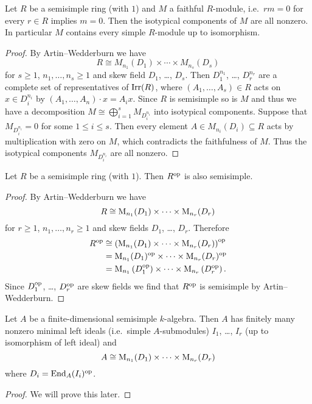 \begin{cor}
  Let $R$ be a semisimple ring (with $1$) and $M$ a faithful $R$-module, i.e.\ $rm = 0$ for every $r \in R$ implies $m = 0$.
  Then the isotypical components of $M$ are all nonzero.
  In particular $M$ contains every simple $R$-module up to isomorphism.
\end{cor}
\begin{proof}
  By Artin--Wedderburn we have
  \[
    R \cong M_{n_1}(D_1) \times \dotsb \times M_{n_s}(D_s)
  \]
  for $s \geq 1$, $n_1, \dotsc, n_s \geq 1$ and skew field $D_1$, \dots, $D_s$.
  Then $D_1^{n_1}$, \dots, $D_r^{n_r}$ are a complete set of representatives of $\operatorname{Irr}(R)$, where $(A_1, \dotsc, A_s) \in R$ acts on $x \in D_i^{n_i}$ by $(A_1, \dotsc, A_n) \cdot x = A_i x$.
  Since $R$ is semisimple so is $M$ and thus we have a decomposition $M \cong \bigoplus_{i=1}^s M_{D_i^{n_i}}$ into isotypical components.
  Suppose that $M_{D_i^{n_i}} = 0$ for some $1 \leq i \leq s$.
  Then every element $A \in M_{n_i}(D_i) \subseteq R$ acts by multiplication with zero on $M$, which contradicts the faithfulness of $M$.
  Thus the isotypical components $M_{D_i^{n_i}}$ are all nonzero.
\end{proof}




\begin{cor}
  Let $R$ be a semisimple ring (with $1$).
  Then $R^{\mathrm{op}}$ is also semisimple.
\end{cor}
\begin{proof}
  By Artin--Wedderburn we have
  \[
    R \cong \operatorname{M}_{n_1}(D_1) \times \dotsm \times \operatorname{M}_{n_r}(D_r)
  \]
  for $r \geq 1$, $n_1, \dotsc, n_r \geq 1$ and skew fields $D_1$, \dots, $D_r$.
  Therefore
  \begin{align*}
            R^{\mathrm{op}}
    &\cong  \left( \operatorname{M}_{n_1}(D_1) \times \dotsm \times \operatorname{M}_{n_r}(D_r) \right)^{\mathrm{op}} \\
    &=      \operatorname{M}_{n_1}(D_1)^{\mathrm{op}} \times \dotsm \times \operatorname{M}_{n_r}(D_r)^{\mathrm{op}} \\
    &=      \operatorname{M}_{n_1}\left( D_1^{\mathrm{op}} \right) \times \dotsm \times \operatorname{M}_{n_r}\left( D_r^{\mathrm{op}} \right).
  \end{align*}
  Since $D_1^{\mathrm{op}}$, \dots, $D_r^{\mathrm{op}}$ are skew fields we find that $R^{\mathrm{op}}$ is semisimple by Artin--Wedderburn.
\end{proof}


\begin{cor}
  Let $A$ be a finite-dimensional semisimple $k$-algebra.
  Then $A$ has finitely many nonzero minimal left ideals (i.e.\ simple $A$-submodules) $I_1$, \dots, $I_r$ (up to isomorphism of left ideal) and
  \[
    A \cong \operatorname{M}_{n_1}(D_1) \times \dotsm \times \operatorname{M}_{n_r}(D_r)
  \]
  where $D_i = \operatorname{End}_A(I_i)^{\mathrm{op}}$.
\end{cor}
\begin{proof}
  We will prove this later.
\end{proof}


